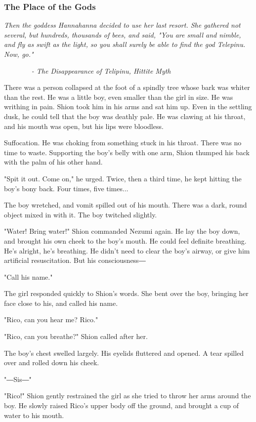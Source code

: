 \subsubsection{The Place of the Gods}

\emph{Then the goddess Hannahanna decided to use her last resort. She
gathered not several, but hundreds, thousands of bees, and said, "You
are small and nimble, and fly as swift as the light, so you shall surely
be able to find the god Telepinu. Now, go."~}

\emph{~ ~ ~ ~ ~- The Disappearance of Telipinu, Hittite Myth}

There was a person collapsed at the foot of a spindly tree whose bark
was whiter than the rest. He was a little boy, even smaller than the
girl in size. He was writhing in pain. Shion took him in his arms and
sat him up. Even in the settling dusk, he could tell that the boy was
deathly pale. He was clawing at his throat, and his mouth was open, but
his lips were bloodless.

Suffocation. He was choking from something stuck in his throat. There
was no time to waste. Supporting the boy's belly with one arm, Shion
thumped his back with the palm of his other hand.

"Spit it out. Come on," he urged. Twice, then a third time, he kept
hitting the boy's bony back. Four times, five times...

The boy wretched, and vomit spilled out of his mouth. There was a dark,
round object mixed in with it. The boy twitched slightly.

"Water! Bring water!" Shion commanded Nezumi again. He lay the boy down,
and brought his own cheek to the boy's mouth. He could feel definite
breathing. He's alright, he's breathing. He didn't need to clear the
boy's airway, or give him artificial resuscitation. But his
consciousness―

"Call his name."

The girl responded quickly to Shion's words. She bent over the boy,
bringing her face close to his, and called his name.

"Rico, can you hear me? Rico."

"Rico, can you breathe?" Shion called after her.

The boy's chest swelled largely. His eyelids fluttered and opened. A
tear spilled over and rolled down his cheek.

"―Sis―"

"Rico!" Shion gently restrained the girl as she tried to throw her arms
around the boy. He slowly raised Rico's upper body off the ground, and
brought a cup of water to his mouth.


